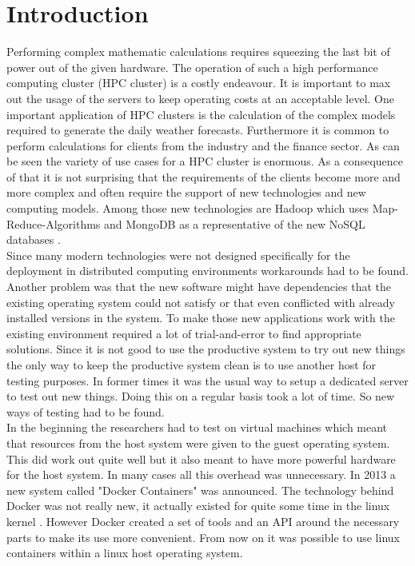 \documentclass[conference]{IEEEtran}
\begin{document}
\section{Introduction}
Performing complex mathematic calculations requires squeezing the last bit of power out of the given hardware. The operation of such a high performance computing cluster (HPC cluster) is a costly endeavour. It is important to max out the usage of the servers to keep operating costs at an acceptable level. One important application of HPC clusters is the calculation of the complex models required to generate the daily weather forecasts. Furthermore it is common to perform calculations for clients from the industry and the finance sector. As can be seen the variety of use cases for a HPC cluster is enormous. As a consequence of that it is not surprising that the requirements of the clients become more and more complex and often require the support of new technologies and new computing models. Among those new technologies are Hadoop which uses Map-Reduce-Algorithms and MongoDB as a representative of the new NoSQL databases \cite{wiese2015,Redmond2012}.\\

Since many modern technologies were not designed specifically for the deployment in distributed computing environments workarounds had to be found. Another problem was that the new software might have dependencies that the existing operating system could not satisfy or that even conflicted with already installed versions in the system. To make those new applications work with the existing environment required a lot of trial-and-error to find appropriate solutions. Since it is not good to use the productive system to try out new things the only way to keep the productive system clean is to use another host for testing purposes. In former times it was the usual way to setup a dedicated server to test out new things. Doing this on a regular basis took a lot of time. So new ways of testing had to be found.\\

In the beginning the researchers had to test on virtual machines which meant that resources from the host system were given to the guest operating system. This did work out quite well but it also meant to have more powerful hardware for the host system. In many cases all this overhead was unnecessary. In 2013 a new system called "Docker Containers" was announced. The technology behind Docker was not really new, it actually existed for quite some time in the linux kernel \cite{Merkel2014}. However Docker created a set of tools and an API around the necessary parts to make its use more convenient. From now on it was possible to use linux containers within a linux host operating system.\\
\end{document}
